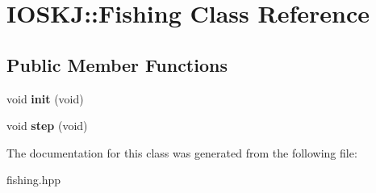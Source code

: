 \hypertarget{classIOSKJ_1_1Fishing}{\section{I\-O\-S\-K\-J\-:\-:Fishing Class Reference}
\label{classIOSKJ_1_1Fishing}
}
\subsection*{Public Member Functions}
\begin{DoxyCompactItemize}
\item 
\hypertarget{classIOSKJ_1_1Fishing_a196a8e595ab828c497576419bb0f491c}{void {\bfseries init} (void)}\label{classIOSKJ_1_1Fishing_a196a8e595ab828c497576419bb0f491c}

\item 
\hypertarget{classIOSKJ_1_1Fishing_a4fe8874e2966eb554fd37b256978deb1}{void {\bfseries step} (void)}\label{classIOSKJ_1_1Fishing_a4fe8874e2966eb554fd37b256978deb1}

\end{DoxyCompactItemize}


The documentation for this class was generated from the following file\-:\begin{DoxyCompactItemize}
\item 
fishing.\-hpp\end{DoxyCompactItemize}
